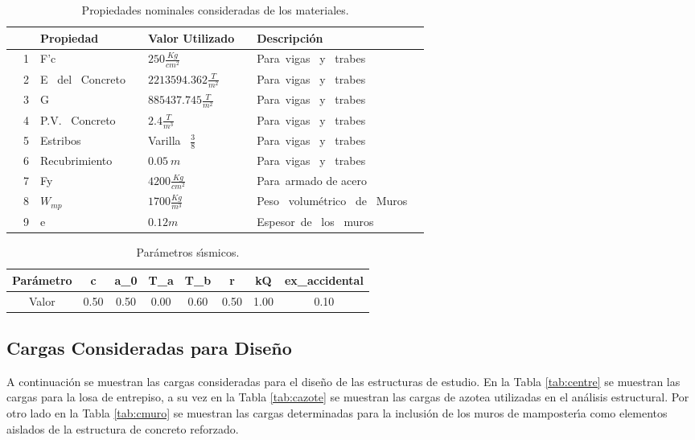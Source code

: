 \begin{table}[htbp]
	\centering
		\caption{Propiedades nominales consideradas de los materiales.}
		\begin{tabular}{llllllll}
			\hline \hline && Propiedad & & Valor Utilizado & &Descripci\'on& &\\ \hline \hline
			&1& F'c & &$250{\frac{Kg}{cm^2}}$ & & Para\ vigas \ y \ trabes &&\\
			\hline
			&2 & E \ del \ Concreto & &$2213594.362{\frac{T}{m^2}}$ & & Para\ vigas \ y \ trabes &&\\
			\hline
			&3& G & &$885437.745{\frac{T}{m^2}}$ & & Para\ vigas \ y \ trabes &&\\
			\hline
			&4 & P.V. \ Concreto & &$2.4{\frac{T}{m^3}}$ & & Para\ vigas \ y \ trabes &&\\
			\hline
			&5 & Estribos & &Varilla \ $\frac{3}{8}$ & & Para\ vigas \ y \ trabes &&\\
			\hline
			&6 & Recubrimiento & & $ 0.05 \ m $ & & Para\ vigas \ y \ trabes &&\\
			\hline
			&7 & Fy & &$4200{\frac{Kg}{cm^2}}$ & & Para\ armado de acero &&\\
			\hline
			&8 & $W_{mp}$ & &$1700{\frac{Kg}{m^3}}$ & & Peso \ volum\'etrico \ de \ Muros &&\\
			\hline
			&9& e & &$0.12{m}$ & & Espesor\ de \ los \ muros &&\\\hline \hline
		\end{tabular}
	\label{tab:promat}
\end{table}

\begin{table}[htbp]
	\centering
		\caption{Par\'ametros s\'{\i}smicos.}
		\begin{tabular}{cccccccc}
			\hline \hline Par\'ametro & c & a_{0} & T_{a} & T_{b} & r & kQ & ex_{accidental} & \\ \hline Valor & 0.50  & 0.50 & 0.00 & 0.60 & 0.50 & 1.00 & 0.10 &\\ \hline \hline
		\end{tabular}
	\label{tab:prosismo}
\end{table}

\newpage

\subsection{Cargas Consideradas para Dise\~no}

A continuaci\'on se muestran las cargas consideradas para el dise\~no de las estructuras de estudio. En la Tabla \ref{tab:centre} se muestran las cargas para la losa de entrepiso, a su vez en la Tabla \ref{tab:cazote} se muestran las cargas de azotea utilizadas en el an\'alisis estructural. Por otro lado en la Tabla \ref{tab:cmuro} se muestran las cargas determinadas para la inclusi\'on de los muros de mamposter\'{\i}a como elementos aislados de la estructura de concreto reforzado. 

